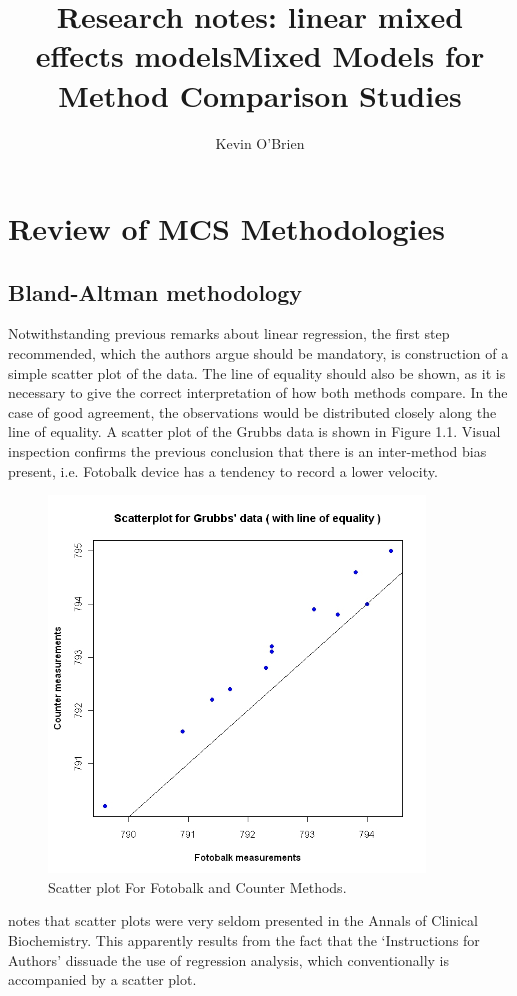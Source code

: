 \documentclass[12pt, a4paper]{report}
\title{Research notes: linear mixed effects models}
\author{ } \date{ }
\theoremstyle{plain}
\theoremstyle{definition}
\theoremstyle{remark}
\begin{document}
	\author{Kevin O'Brien}
	\title{Mixed Models for Method Comparison Studies}
	\tableofcontents

	\chapter{Review of MCS Methodologies}
	\section{Bland-Altman methodology}

	
	Notwithstanding previous remarks about linear regression, the first step recommended, which the authors argue should be mandatory, is construction of a simple scatter plot of the data. The line of equality should also be shown, as it is necessary to give the correct interpretation of how both methods compare. In the case of good agreement, the observations would be distributed closely along the line of equality. A scatter plot of the Grubbs data is shown in Figure 1.1. Visual inspection confirms the previous conclusion that there is an inter-method bias present, i.e. Fotobalk device has a tendency to record a lower velocity.
	
	\begin{figure}[h!]
		\begin{center}
			\includegraphics[width=100mm]{images/GrubbsScatter.jpeg}
			\caption{Scatter plot For Fotobalk and Counter Methods.}\label{GrubbsScatter}
		\end{center}
	\end{figure}
	
	\citet{Dewitte} notes that scatter plots were very seldom presented in the Annals of Clinical Biochemistry. This apparently
	results from the fact that the `Instructions for Authors' dissuade the use of regression analysis, which conventionally is accompanied by a scatter plot.
	
\end{document}
